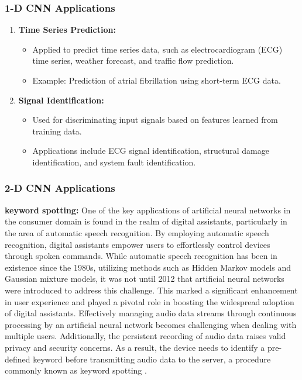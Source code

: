 \subsubsection{1-D CNN Applications}

\begin{enumerate}
	\item \textbf{Time Series Prediction:}
	\begin{itemize}
		\item Applied to predict time series data, such as electrocardiogram (ECG) time series, weather forecast, and traffic flow prediction.
		\item Example: Prediction of atrial fibrillation using short-term ECG data.
	\end{itemize}
	
	\item \textbf{Signal Identification:}
	\begin{itemize}
		\item Used for discriminating input signals based on features learned from training data.
		\item Applications include ECG signal identification, structural damage identification, and system fault identification.
	\end{itemize}
\end{enumerate}

\subsubsection{2-D CNN Applications}

\textbf{keyword spotting:} One of the key applications of artificial neural networks in the consumer domain is found in the realm of digital assistants, particularly in the area of automatic speech recognition. By employing automatic speech recognition, digital assistants empower users to effortlessly control devices through spoken commands. While automatic speech recognition has been in existence since the 1980s, utilizing methods such as Hidden Markov models and Gaussian mixture models, it was not until 2012 that artificial neural networks were introduced to address this challenge. This marked a significant enhancement in user experience and played a pivotal role in boosting the widespread adoption of digital assistants. Effectively managing audio data streams through continuous processing by an artificial neural network becomes challenging when dealing with multiple users. Additionally, the persistent recording of audio data raises valid privacy and security concerns. As a result, the device needs to identify a pre-defined keyword before transmitting audio data to the server, a procedure commonly known as keyword spotting \cite{Bushur:2023}.

